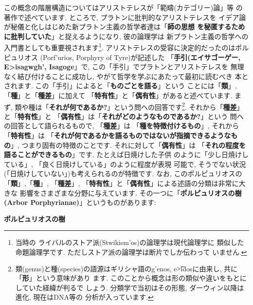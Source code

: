 この概念の階層構造についてはアリストテレスが「範疇(カテゴリー)論」等
の著作で述べています. ところで, プラトンに批判的なアリストテレスを
イデア論が秘儀と化しはじめた新プラトン主義の哲学者達は「\textbf{師の思想
を秘匿するために批判していた}」と捉えるようになり, 彼の論理学は
新プラトン主義の哲学への入門書としても重要視されます\footnote{当時の
ライバルのストア派(\textgreek{Stwikism'os})の論理学は現代論理学に
類似した命題論理学です. ただしストア派の論理学は断片でしか伝わって
いません.}. アリストテレスの受容に決定的だったのはポルピュリオス
(\textgreek{Porf'urios}, Porphyry of Tyre)が記述した
「\textbf{手引(エイサゴーゲー, \textgreek{E>isagwgh'},
 Isagoge\cite{Barnes}}」で, この「手引」でプラトンとアリストテレスを
無理なく結び付けることに成功し, やがて哲学を学ぶにあたって最初に読むべき
本とされます. この「手引」によると「\textbf{ものごとを語る}」という
ことには「\textbf{類}」, 「\textbf{種}」と「\textbf{種差}」に加えて
「\textbf{特有性}」と「\textbf{偶有性}」があると述べています. まず,
 類や種は「\textbf{それが何であるか?}」という問への回答です\footnote{
類(genus)と種(species)の語源はギリシャ語の\textgreek{g'enos}, 
 \textgreek{e\t{>i}dos}に由来し, 共に「\textbf{形}」という意味があり
ます. このことから概念は形の類似や違いをもとにしていた経緯が判るで
しょう. 分類学で当初はその形態, ダーウィン以降は進化, 現在はDNA等の
分析が入っています.}. それから「\textbf{種差}」と「\textbf{特有性}」と
「\textbf{偶有性}」は「\textbf{それがどのようなものであるか?}」という
問への回答として語られるもので, 「\textbf{種差}」は
「\textbf{種を特徴付けるもの}」, それから「\textbf{特有性}」は
「\textbf{それが何であるかを語るものではないが指摘できるようなもの}」,
 つまり固有の特徴のことです. それに対して「\textbf{偶有性}」は
「\textbf{それの程度を語ることができるもの}」です. たとえば日焼けした子供
のように「少し日焼けしている」, 「良く日焼けしている」のように程度が表現
可能で, そうでない状況(「日焼けしていない」)も考えられるのが特徴です. なお,
 このポルピュリオスの「\textbf{類}」,「\textbf{種}」, 「\textbf{種差}」,
 「\textbf{特有性}」と「\textbf{偶有性}」による述語の分類は非常に大きな
影響をさまざまな分野に与えています. その一つに「\textbf{ポルピュリオスの樹
(Arbor Porphyrianae)}」というものがあります:


\begin{itembox}[c]{\textbf{ポルピュリオスの樹}}
{\tiny
{}
}
\end{itembox}

